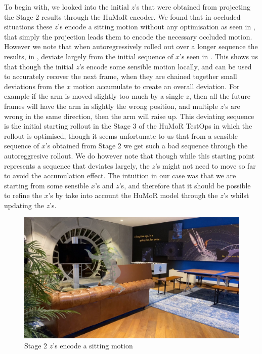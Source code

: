 To begin with, we looked into the initial $z$'s that were obtained from projecting the Stage 2 results through the HuMoR encoder. We found that in occluded situations these $z$'s encode a sitting motion without any optimisation as seen in , that simply the projection leads them to encode the necessary occluded motion. However we note that when autoregressively rolled out over a longer sequence the results, in , deviate largely from the initial sequence of $x$'s seen in . This shows us that though the initial $z$'s encode some sensible motion locally, and can be used to accurately recover the next frame, when they are chained together small deviations from the $x$ motion accumulate to create an overall deviation. For example if the arm is moved slightly too much by a single $z$, then all the future frames will have the arm in slightly the wrong position, and multiple $z$'s are wrong in the same direction, then the arm will raise up. This deviating sequence is the initial starting rollout in the Stage 3 of the HuMoR TestOps in which the rollout is optimised, though it seems unfortunate to us that from a sensible sequence of $x$'s obtained from Stage 2 we get such a bad sequence through the autoreggresive rollout. We do however note that though while this starting point represents a sequence that deviates largely, the $z$'s might not need to move so far to avoid the accumulation effect. The intuition in our case was that we are starting from some sensible $x$'s and $z$'s, and therefore that it should be possible to refine the $x$'s by take into account the HuMoR model through the $z$'s whilst updating the $z$'s. 

\begin{figure}[!ht]
    \centering
    \includegraphics[width=1\textwidth]{Figures/humor/improvement/Rollout_stage_2/sitting_clip/rollout_sitting_example/frame_00000078.jpg}
    \caption{Stage 2 $z$'s encode a sitting motion}
    \label{fig:humor_stage_2_rollout_sitting}
\end{figure}



